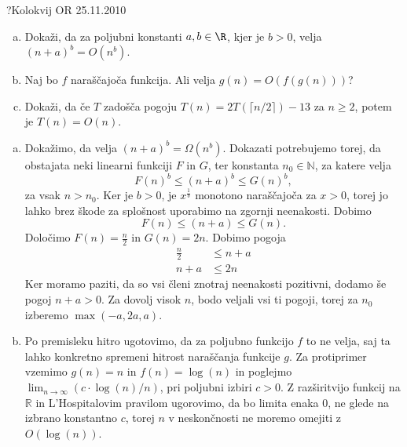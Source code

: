 \begin{naloga}{?}{Kolokvij OR 25.11.2010}
\begin{vprasanje}
\begin{enumerate}[(a)]
\item Dokaži, da za poljubni konstanti $a, b \in \R$, kjer je $b > 0$,
velja ${(n + a)}^b = O(n^b)$.

\item Naj bo $f$ naraščajoča funkcija.
Ali velja $g(n) = O(f(g(n)))$?

\item Dokaži,
da če $T$ zadošča pogoju $T(n) = 2T(\lceil n/2 \rceil) - 13$ za $n \ge 2$,
potem je $T(n) = O(n)$.
\end{enumerate}
\end{vprasanje}

\begin{odgovor}
\begin{enumerate}[(a)]
\item Dokažimo, da velja $(n + a)^b = \Omega(n^b)$.
Dokazati potrebujemo torej, da obstajata neki linearni funkciji $F$ in $G$, ter konstanta $n_0 \in \mathbb{N}$,
za katere velja $$F(n)^b \leq (n + a)^b \leq G(n)^b,$$ za vsak $n > n_0$.
Ker  je $b > 0$, je $x^{\frac{1}{b}}$ monotono naraščajoča za $x>0$,
torej jo lahko brez škode za splošnost uporabimo na zgornji neenakosti.
Dobimo $$F(n) \leq (n + a) \leq G(n).$$
Določimo $F(n) = \frac{n}{2}$ in $G(n) = 2n$.
Dobimo pogoja
\begin{align*}
\frac{n}{2} &\leq n + a \\
n + a &\leq 2n
\end{align*}
Ker moramo paziti, da so vsi členi znotraj neenakosti pozitivni, dodamo še pogoj $n + a > 0$.
Za dovolj visok $n$, bodo veljali vsi ti pogoji, torej za $n_0$ izberemo $\max(-a, 2a, a)$.

\item Po premisleku hitro ugotovimo, da za poljubno funkcijo $f$ to ne velja,
saj ta lahko konkretno spremeni hitrost naraščanja funkcije $g$.
Za protiprimer vzemimo $g(n) = n$ in $f(n) = \log(n)$ in poglejmo 
$\lim_{n \rightarrow \infty} (c \cdot \log(n) / n)$, pri poljubni izbiri $c > 0$.
Z razširitvijo funkcij na $\mathbb{R}$ in L'Hospitalovim pravilom ugorovimo, 
da bo limita enaka 0, ne glede na izbrano konstantno $c$, 
torej $n$ v neskončnosti ne moremo omejiti z $O(\log(n))$.


\end{enumerate}
\end{odgovor}
\end{naloga}
